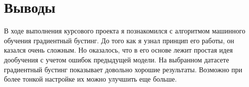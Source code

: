 \section{Выводы}
В ходе выполнения курсового проекта я познакомился с алгоритмом машинного обучения градиентный бустинг. До того как я узнал принцип его работы, он казался очень сложным. Но оказалось, что в его основе лежит простая идея дообучения с учетом ошибок предыдущей модели. На выбранном датасете градиентный бустинг показывает довольно хорошие результаты. Возможно при более тонкой настройке их можно улучшить еще больше.
\pagebreak

